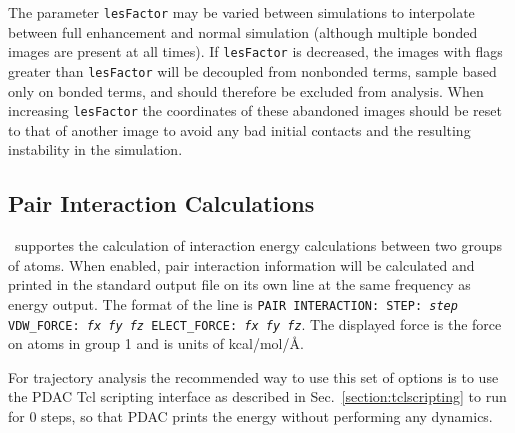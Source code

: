 The parameter {\tt lesFactor} may be varied between simulations to
interpolate between full enhancement and normal simulation (although
multiple bonded images are present at all times).  If {\tt lesFactor}
is decreased, the images with flags greater than {\tt lesFactor} will
be decoupled from nonbonded terms, sample based only on bonded terms,
and should therefore be excluded from analysis.  When increasing
{\tt lesFactor} the coordinates of these abandoned images should be
reset to that of another image to avoid any bad initial contacts and
the resulting instability in the simulation.

\subsection{Pair Interaction Calculations}
\label{section:pairinteraction}
\PDAC\ supportes the calculation of interaction energy calculations between 
two groups of atoms.  When enabled, pair interaction information will be
calculated and printed in the standard output file on its own line at the
same frequency as energy output.  The format of the line is
{\tt PAIR INTERACTION: STEP: {\it step} VDW\_FORCE: {\it fx fy fz} 
ELECT\_FORCE: {\it fx fy fz}}.
The displayed force is the force on atoms in group 1 and is units of 
kcal/mol/\AA. 

For trajectory analysis the 
recommended way to use this set of options is to use the PDAC Tcl scripting 
interface as described in Sec.~\ref{section:tclscripting} to run for
0 steps, so that PDAC prints the energy without performing any dynamics.

